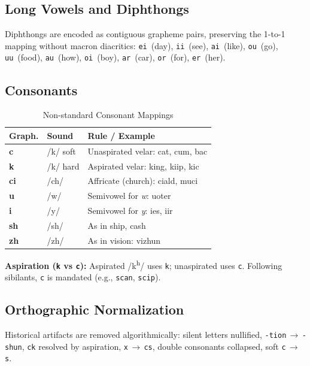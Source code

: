 \documentclass[10pt,onecolumn,letterpaper]{article}
\newcommand{\me}[1]{\texttt{#1}}
\begin{document}
\subsection{Long Vowels and Diphthongs}
Diphthongs are encoded as contiguous grapheme pairs, preserving the 1-to-1
mapping without macron diacritics: \me{ei}~(day), \me{ii}~(see),
\me{ai}~(like), \me{ou}~(go), \me{uu}~(food), \me{au}~(how),
\me{oi}~(boy), \me{ar}~(car), \me{or}~(for), \me{er}~(her).

\subsection{Consonants}

\begin{table}[h!]
\centering\small
\begin{tabularx}{\linewidth}{llX}
\toprule
\textbf{Graph.} & \textbf{Sound} & \textbf{Rule / Example} \\
\midrule
\textbf{c}  & /k/ soft      & Unaspirated velar: cat, cum, bac \\
\textbf{k}  & /k/ hard      & Aspirated velar: king, kiip, kic \\
\textbf{ci} & /ch/          & Affricate (church): ciald, muci \\
\textbf{u}  & /w/           & Semivowel for \textit{w}: uoter \\
\textbf{i}  & /y/           & Semivowel for \textit{y}: ies, iir \\
\textbf{sh} & /sh/          & As in ship, cash \\
\textbf{zh} & /zh/          & As in vision: vizhun \\
\bottomrule
\end{tabularx}
\caption{Non-standard Consonant Mappings}
\end{table}

\textbf{Aspiration (\me{k} vs \me{c}):} Aspirated /k\textsuperscript{h}/
uses \me{k}; unaspirated uses \me{c}. Following sibilants, \me{c} is
mandated (e.g., \me{scan}, \me{scip}).

\subsection{Orthographic Normalization}
Historical artifacts are removed algorithmically: silent letters nullified,
\me{-tion}\,$\to$\,\me{-shun}, \me{ck} resolved by aspiration,
\me{x}\,$\to$\,\me{cs}, double consonants collapsed, soft \me{c}\,$\to$\,\me{s}.

\end{document}
